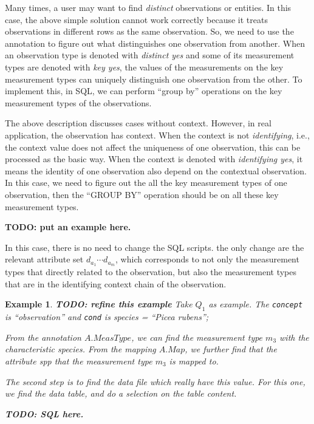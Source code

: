 \documentclass[conference]{IEEEtran}
\newtheorem{example}{Example}[section]
\begin{document}
Many times, a user may want to find {\em distinct} observations or
entities. In this case, the above simple solution cannot work
correctly because it treats observations in different rows as the same
observation. So, we need to use the annotation to figure out what
distinguishes one observation from another. 
When an observation type is denoted with {\em distinct yes} and some
of its measurement types are denoted with {\em key yes}, 
the values of the measurements on the key measurement types can
uniquely distinguish one observation from the other. 
To implement this, in SQL, we can perform ``group by'' operations on
the key measurement types of the observations. 

The above description discusses cases without context. 
However, in real application, the observation has context. 
When the context is not {\em identifying}, i.e., the context value
does not affect the uniqueness of one observation, this can be
processed as the basic way. 
When the context is denoted with {\em identifying yes}, it means the
identity of one observation also depend on the contextual
observation. 
In this case, we need to figure out the all the key measurement types
of one observation, then the ``GROUP BY'' operation should be on all
these key measurement types. 

{\bf TODO: put an example here.}

In this case, there is no need to change the SQL scripts.
the only change are the relevant attribute set $d_{a_1} \cdots
d_{a_m}$, which corresponds to not only the measurement types that
directly related to the observation, but also the measurement types
that are in the identifying context chain of the observation. 

\begin{example}\label{eg:query_reqerite_q1}
{\bf TODO: refine this example} 
Take $Q_1$ as example. The {\tt concept} is ``observation'' and {\tt cond} is {\em species = ``Picea rubens''}; 

From the annotation $A.MeasType$, we can find the measurement type
$m_3$ with the characteristic {\em species}. 
From the mapping $A.Map$, we further find that the attribute {\em spp} that the
measurement type $m_3$ is mapped to. 

The second step is to find the data file which really have this value. 
For this one, we find the data table, and do a selection on the table
content. 

{\bf TODO: SQL here.} 
\end{example}
\end{document}
